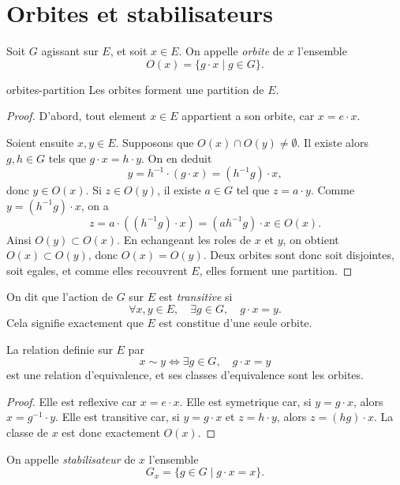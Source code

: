 \section*{Orbites et stabilisateurs}


Soit $G$ agissant sur $E$, et soit $x \in E$.
On appelle \textit{orbite} de $x$ l'ensemble
\[
    O(x)=\{g\cdot x \mid g \in G\}.
\]

\begin{proposition}{}{orbites-partition}
    Les orbites forment une partition de $E$.
\end{proposition}

\begin{proof}
    D'abord, tout element $x \in E$ appartient a son orbite, car
    $x=e\cdot x$.

    Soient ensuite $x,y \in E$. Supposons que $O(x)\cap O(y)\neq\emptyset$.
    Il existe alors $g,h\in G$ tels que $g\cdot x=h\cdot y$. On en deduit
    \[
        y = h^{-1}\cdot(g\cdot x)=(h^{-1}g)\cdot x,
    \]
    donc $y\in O(x)$. Si $z\in O(y)$, il existe $a\in G$ tel que
    $z=a\cdot y$. Comme $y=(h^{-1}g)\cdot x$, on a
    \[
        z=a\cdot((h^{-1}g)\cdot x)=(ah^{-1}g)\cdot x \in O(x).
    \]
    Ainsi $O(y)\subset O(x)$. En echangeant les roles de $x$ et $y$, on obtient
    $O(x)\subset O(y)$, donc $O(x)=O(y)$. Deux orbites sont donc soit disjointes,
    soit egales, et comme elles recouvrent $E$, elles forment une partition.
\end{proof}

On dit que l'action de $G$ sur $E$ est \textit{transitive} si
\[
    \forall x,y \in E,\quad \exists g\in G,\quad g\cdot x=y.
\]
Cela signifie exactement que $E$ est constitue d'une seule orbite.

\begin{remarque}
    La relation definie sur $E$ par
    \[
        x\sim y \iff \exists g\in G,\quad g\cdot x=y
    \]
    est une relation d'equivalence, et ses classes d'equivalence sont les orbites.
\end{remarque}

\begin{proof}
    Elle est reflexive car $x=e\cdot x$. Elle est symetrique car, si
    $y=g\cdot x$, alors $x=g^{-1}\cdot y$. Elle est transitive car, si
    $y=g\cdot x$ et $z=h\cdot y$, alors $z=(hg)\cdot x$.
    La classe de $x$ est donc exactement $O(x)$.
\end{proof}

On appelle \textit{stabilisateur} de $x$ l'ensemble
\[
    G_x=\{g\in G \mid g\cdot x=x\}.
\]

